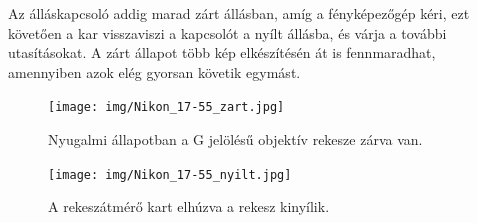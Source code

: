 Az álláskapcsoló addig marad zárt állásban, amíg a fényképezőgép kéri, ezt követően a kar visszaviszi a kapcsolót a nyílt állásba, és várja a további utasításokat.
A zárt állapot több kép elkészítésén át is fennmaradhat, amennyiben azok elég gyorsan követik egymást.

\begin{figure}[H]
	\centering
	\texttt{[image: img/Nikon\_17-55\_zart.jpg]}
	\caption{Nyugalmi állapotban a G jelölésű objektív rekesze zárva van.}
	\label{fig:17-55_zart}
\end{figure}

\begin{figure}[H]
	\centering
	\texttt{[image: img/Nikon\_17-55\_nyilt.jpg]}
	\caption{A rekeszátmérő kart elhúzva a rekesz kinyílik.}
	\label{fig:17-55_nyilt}
\end{figure}